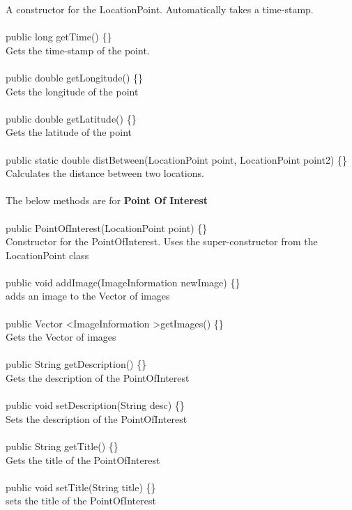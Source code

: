 \documentclass[12pt]{article}
\begin{document}
A constructor for the LocationPoint. Automatically takes a time-stamp.~\\\\
public long getTime() \{\} ~\\
Gets the time-stamp of the point. ~\\\\
public double getLongitude() \{\}~\\
Gets the longitude of the point ~\\\\
public double getLatitude() \{\} ~\\
Gets the latitude of the point~\\\\
public static double distBetween(LocationPoint point, LocationPoint point2) \{\} ~\\
Calculates the distance between two locations. ~\\\\
The below methods are for \textbf{Point Of Interest} ~\\\\
public PointOfInterest(LocationPoint point) \{\}~\\
Constructor for the PointOfInterest. Uses the super-constructor from the LocationPoint class ~\\\\
public void addImage(ImageInformation newImage) \{\}~\\ 
adds an image to the Vector of images~\\\\
public Vector \textless ImageInformation \textgreater getImages() \{\}~\\
Gets the Vector of images~\\\\
public String getDescription() \{\}~\\
Gets the description of the PointOfInterest ~\\\\
public void setDescription(String desc) \{\} ~\\
Sets the description of the PointOfInterest ~\\\\
public String getTitle() \{\} ~\\
Gets the title of the PointOfInterest ~\\\\
public void setTitle(String title) \{\}~\\
sets the title of the PointOfInterest ~\\\\
\end{document}
